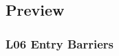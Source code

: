 %
%
%
%
%
%
%
%
%
%
%
%
%
%
%
%
%
%
%
%
%
%
%

\subsection{Preview}

\begin{frame}
	\frametitle{L06 Entry Barriers}
\end{frame}



